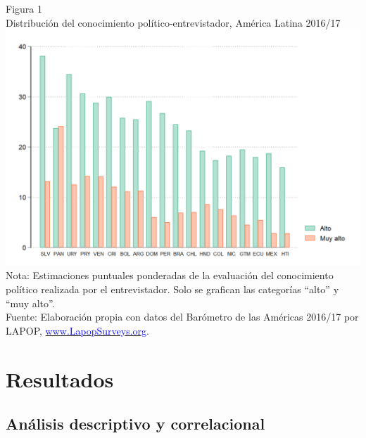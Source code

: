 \documentclass[a4paper]{tufte-handout}
\begin{document}
\begin{marginfigure}
  \centering
  \smallskip\noindent\small Figura 1 \\ Distribución del conocimiento político-entrevistador, América Latina 2016/17
  \includegraphics[width=.95\linewidth]{figures/conocim}
  \\ \smallskip\noindent\scriptsize Nota: Estimaciones puntuales ponderadas de la evaluación del conocimiento político realizada por el entrevistador. Solo se grafican las categorías “alto” y “muy alto”.\\
  Fuente: Elaboración propia con datos del Barómetro de las Américas 2016/17 por LAPOP, \href{https://www.vanderbilt.edu/lapop/}{\textcolor{blue}{www.LapopSurveys.org}}.
\end{marginfigure}


\section[Resultados] {{\normalfont Resultados}}


\subsection[Análisis descriptivo y correlacional] {Análisis descriptivo y correlacional}

\end{document}
